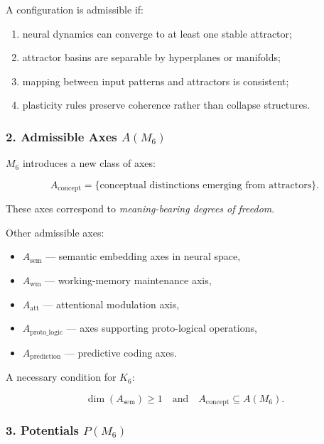 A configuration is admissible if:

\begin{enumerate}
    \item neural dynamics can converge to at least one stable attractor;
    \item attractor basins are separable by hyperplanes or manifolds;
    \item mapping between input patterns and attractors is consistent;
    \item plasticity rules preserve coherence rather than collapse structures.
\end{enumerate}

\subsubsection*{2. Admissible Axes \texorpdfstring{$A(M_6)$}{A(M_6)}}

$M_6$ introduces a new class of axes:

\[
A_{\mathrm{concept}} = \{ \text{conceptual distinctions emerging from attractors} \}.
\]

These axes correspond to \emph{meaning-bearing degrees of freedom}.

Other admissible axes:

\begin{itemize}
    \item $A_{\mathrm{sem}}$ — semantic embedding axes in neural space,
    \item $A_{\mathrm{wm}}$ — working-memory maintenance axis,
    \item $A_{\mathrm{att}}$ — attentional modulation axis,
    \item $A_{\mathrm{proto\_logic}}$ — axes supporting proto-logical operations,
    \item $A_{\mathrm{prediction}}$ — predictive coding axes.
\end{itemize}

A necessary condition for $K_6$:

\[
\dim(A_{\mathrm{sem}}) \ge 1
\quad\text{and}\quad 
A_{\mathrm{concept}} \subseteq A(M_6).
\]

\subsubsection*{3. Potentials \texorpdfstring{$P(M_6)$}{P(M_6)}}

